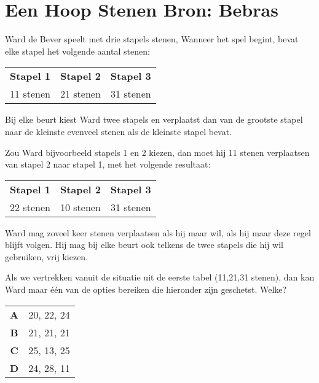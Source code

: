 \documentclass[12pt, a4paper]{article}
\begin{document}
	\begin{minipage}{\textwidth}
		\section{Een Hoop Stenen \hfill\small Bron: Bebras}
			Ward de Bever speelt met drie stapels stenen, Wanneer het spel begint, bevat elke stapel het volgende aantal stenen:
			\begin{table}[H]
				\centering
				\begin{tabular}{c c c}
					\textbf{Stapel 1} & \textbf{Stapel 2} & \textbf{Stapel 3} \\
					11 stenen & 21 stenen & 31 stenen \\
				\end{tabular}
			\end{table}
			Bij elke beurt kiest Ward twee stapels en verplaatst dan van de grootste stapel naar de kleinste evenveel stenen als de kleinste stapel bevat.
			
			Zou Ward bijvoorbeeld stapels 1 en 2 kiezen, dan moet hij 11 stenen verplaatsen van stapel 2 naar stapel 1, met het volgende resultaat:
			\begin{table}[H]
				\centering
				\begin{tabular}{c c c}
					\textbf{Stapel 1} & \textbf{Stapel 2} & \textbf{Stapel 3} \\
					22 stenen & 10 stenen & 31 stenen \\
				\end{tabular}
			\end{table}
			Ward mag zoveel keer stenen verplaatsen als hij maar wil, als hij maar deze regel blijft volgen. Hij mag bij elke beurt ook telkens de twee stapels die hij wil gebruiken, vrij kiezen.
			
			Als we vertrekken vanuit de situatie uit de eerste tabel (11,21,31 stenen), dan kan Ward maar \'e\'en van de opties bereiken die hieronder zijn geschetst. Welke?
	
			\begin{table}[H]
				\centering
				\begin{tabular}{|c|c|}
					\hline
					\textbf{A} & 20, 22, 24 \\
					\textbf{B} & 21, 21, 21 \\ 
					\textbf{C} & 25, 13, 25 \\ 
					\textbf{D} & 24, 28, 11 \\
					\hline 
				\end{tabular}
			\end{table}
	\end{minipage} \\ \\
	
\end{document}
